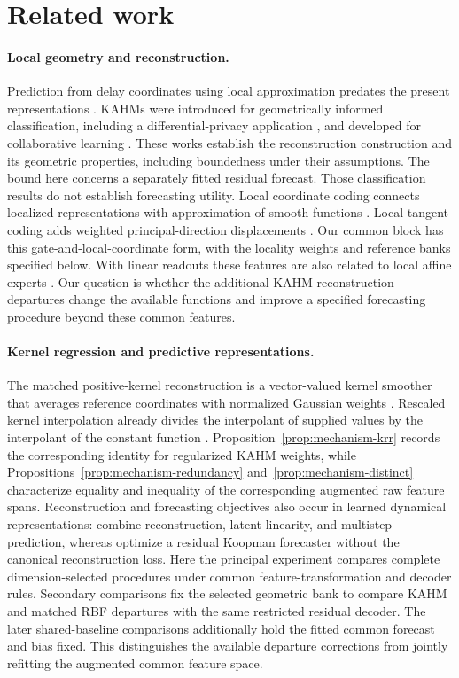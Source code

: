 \section{Related work}\label{sec:related}

\paragraph{Local geometry and reconstruction.}
Prediction from delay coordinates using local approximation predates
the present representations \citep{Farmer1987Prediction}. KAHMs were
introduced for geometrically informed classification, including a
differential-privacy application \citep{Kumar2024KAHM}, and developed
for collaborative learning \citep{Kumar2025Collaborative}. These works
establish the reconstruction construction and its geometric properties,
including boundedness under their assumptions. The bound here concerns
a separately fitted residual forecast. Those classification results do
not establish forecasting utility. Local coordinate coding
connects localized representations with approximation of smooth
functions \citep{Yu2009LCC}. Local tangent coding adds weighted
principal-direction displacements \citep{Yu2010LTC}. Our common block
has this gate-and-local-coordinate form, with the locality weights and
reference banks specified below. With linear readouts these features
are also related to local affine experts \citep{Jacobs1991Experts}.
Our question is whether the additional KAHM reconstruction departures
change the available functions and improve a specified forecasting
procedure beyond these common features.

\paragraph{Kernel regression and predictive representations.}
The matched positive-kernel reconstruction is a vector-valued kernel
smoother that averages reference coordinates with normalized Gaussian
weights \citep{Nadaraya1964Regression}. Rescaled kernel interpolation
already divides the interpolant of supplied values by the interpolant
of the constant function
\citep{Deparis2014Rescaled,DeMarchi2017Rescaled}.
Proposition~\ref{prop:mechanism-krr} records the corresponding identity
for regularized KAHM weights, while
Propositions~\ref{prop:mechanism-redundancy}
and~\ref{prop:mechanism-distinct} characterize equality and inequality of
the corresponding augmented raw feature spans. Reconstruction and
forecasting objectives also occur in learned dynamical representations:
\citet{Lusch2018Embeddings} combine reconstruction, latent linearity,
and multistep prediction, whereas \citet{Liu2023Koopa} optimize a
residual Koopman forecaster without the canonical reconstruction loss.
Here the principal experiment compares complete dimension-selected
procedures under common feature-transformation and decoder rules.
Secondary comparisons fix the selected geometric bank to compare
KAHM and matched RBF departures with the same restricted residual decoder.
The later shared-baseline comparisons additionally hold the fitted common
forecast and bias fixed. This distinguishes the available departure
corrections from jointly refitting the augmented common feature space.

